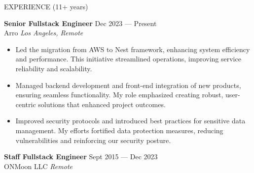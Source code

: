 \documentclass{template} %
\begin{document}
\begin{rSection}{EXPERIENCE (11+ years)}

\textbf{Senior Fullstack Engineer} \hfill Dec 2023 --- Present\\
Arro \hfill \textit{Los Angeles, Remote}
\begin{minipage}{0.95\textwidth}
 \begin{itemize}
    \vspace{0.1cm}
    \itemsep 1pt {}  
    \item Led the migration from AWS to Nest framework, enhancing system efficiency and performance. This initiative streamlined operations, improving service reliability and scalability.
    \item Managed backend development and front-end integration of new products, ensuring seamless functionality. My role emphasized creating robust, user-centric solutions that enhanced project outcomes.
    \item Improved security protocols and introduced best practices for sensitive data management. My efforts fortified data protection measures, reducing vulnerabilities and reinforcing our security posture.
 \end{itemize}
\end{minipage}

\textbf{Staff Fullstack Engineer} \hfill Sept 2015 --- Dec 2023\\
ONMoon LLC \hfill \textit{Remote}


\end{rSection}
\end{document}

